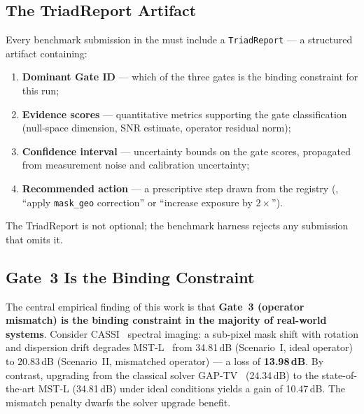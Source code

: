 \subsection{The TriadReport Artifact}

Every benchmark submission in the \pwm{} must include a
\texttt{TriadReport} --- a structured artifact containing:
%
\begin{enumerate}
    \item \textbf{Dominant Gate ID} --- which of the three gates is the
          binding constraint for this run;
    \item \textbf{Evidence scores} --- quantitative metrics supporting the
          gate classification (null-space dimension, SNR estimate,
          operator residual norm);
    \item \textbf{Confidence interval} --- uncertainty bounds on the gate
          scores, propagated from measurement noise and calibration
          uncertainty;
    \item \textbf{Recommended action} --- a prescriptive step drawn from
          the registry (\eg, ``apply \texttt{mask\_geo} correction'' or
          ``increase exposure by $2\times$'').
\end{enumerate}
%
The TriadReport is not optional; the benchmark harness rejects any
submission that omits it.

\subsection{Gate~3 Is the Binding Constraint}

The central empirical finding of this work is that \textbf{Gate~3
(operator mismatch) is the binding constraint in the majority of
real-world systems}.  Consider CASSI~\cite{wagadarikar2008cassi} spectral imaging: a sub-pixel
mask shift with rotation and dispersion drift degrades MST-L~\cite{cai2022mst} from 34.81\,dB (Scenario~I, ideal operator) to
20.83\,dB (Scenario~II, mismatched operator) --- a loss of
\textbf{13.98\,dB}.  By contrast, upgrading from the classical solver
GAP-TV~\cite{yuan2016gaptv} (24.34\,dB) to the state-of-the-art MST-L (34.81\,dB) under ideal
conditions yields a gain of 10.47\,dB.  The mismatch penalty dwarfs the
solver upgrade benefit.

